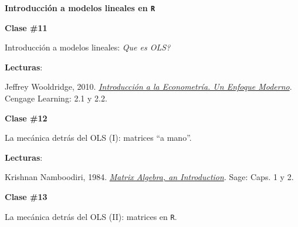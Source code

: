 \documentclass[letterpaper]{article}
\renewenvironment{itemize}{
  \begin{list}{}{
    \setlength{\leftmargin}{1.5em}
  }
}{
  \end{list}
}
\begin{document}
\begin{enumerate}
	\item {\bf Introducci\'on a modelos lineales en \texttt{R}}


			\begin{itemize} 
				\item[$\bullet$] {\bf Clase \#11}
					\begin{itemize} 
						\item[$\circ$] Introducci\'on a modelos lineales: \emph{Que es OLS?}
						\item[$\circ$] {\bf Lecturas}: 
							\begin{itemize}
								\item[$\diamond$] Jeffrey Wooldridge, 2010. \href{https://github.com/hbahamonde/Metodos_de_Investigacion/raw/master/Readings/Wooldridge.pdf}{\emph{Introducci\'on a la Econometr\'ia. Un Enfoque Moderno}}. Cengage Learning: 2.1 y 2.2.
							\end{itemize}
					\end{itemize}
			\end{itemize}



			\begin{itemize} 
				\item[$\bullet$] {\bf Clase \#12}
					\begin{itemize} 
						\item[$\circ$] La mec\'anica detr\'as del OLS (I): matrices ``a mano''.
						\item[$\circ$] {\bf Lecturas}: 
							\begin{itemize}
								\item[$\diamond$] Krishnan Namboodiri, 1984. \href{https://github.com/hbahamonde/Metodos_de_Investigacion/raw/master/Readings/Namboodiri.pdf}{\emph{Matrix Algebra, an Introduction}}. Sage: Caps. 1 y 2.
							\end{itemize}
					\end{itemize}
			\end{itemize}

			\begin{itemize} 
				\item[$\bullet$] {\bf Clase \#13}
					\begin{itemize} 
						\item[$\circ$] La mec\'anica detr\'as del OLS (II): matrices en \texttt{R}.
					\end{itemize}
			\end{itemize}




\end{enumerate}
\end{document}
